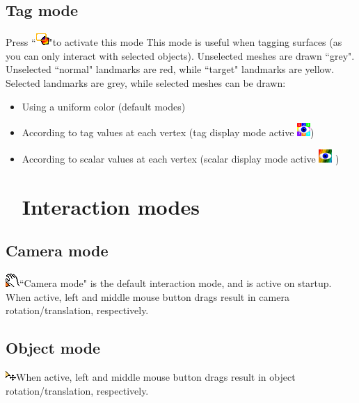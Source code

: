\subsection{Tag mode}
Press ``\includegraphics[scale=0.7]{images/pixmap/Tag_select_mode.png}"to activate this mode
This mode is useful when tagging surfaces (as you can only interact with selected objects). Unselected meshes are drawn ``grey".  Unselected ``normal" landmarks are red, while ``target" landmarks are yellow. Selected landmarks are grey, while selected meshes can be drawn:
\begin{itemize}
\item	Using a uniform color (default modes)
\item According to tag values at each vertex (tag display mode active \includegraphics[scale=0.7]{images/pixmap/Show_Tag_Window.png})
\item	According to scalar values at each vertex (scalar display mode active \includegraphics[scale=0.7]{images/pixmap/show_color_scale.png} )
\section{Interaction modes}
\end{itemize}

\subsection{Camera mode}
  \includegraphics[scale=0.7]{images/pixmap/move.png}``Camera mode" is the default interaction mode, and is active on startup. When active, left and middle mouse button drags result in camera rotation/translation, respectively.
\subsection{Object mode}
   \includegraphics[scale=0.7]{images/pixmap/move_mode2.png}When active, left and middle mouse button drags result in object rotation/translation, respectively.
